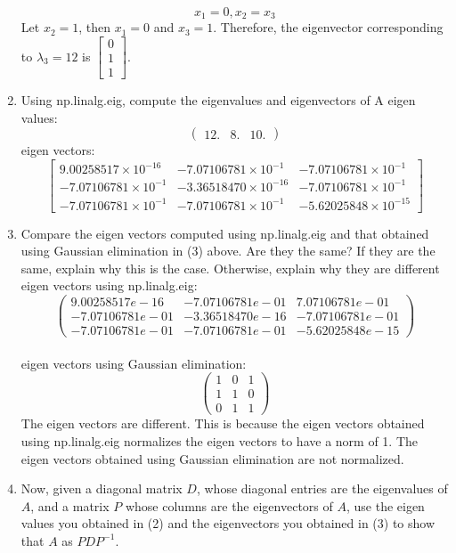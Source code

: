 \documentclass[12pt]{extarticle} %
\begin{document}
\begin{enumerate}
\[    \]
    \[
    x_1 = 0, x_2 = x_3
    \]
    Let $x_2 = 1$, then $x_1 = 0$ and $x_3 = 1$. Therefore, the eigenvector corresponding to $\lambda_3 = 12$ is $\begin{bmatrix} 0 \\ 1 \\ 1 \end{bmatrix}$.
    \item Using np.linalg.eig, compute the eigenvalues and eigenvectors of A
    eigen values:
    \[
    \begin{pmatrix}
        12. & 8. & 10.
    \end{pmatrix}
    \]
    eigen vectors:
    \[
        \begin{bmatrix}
            9.00258517 \times 10^{-16} & -7.07106781 \times 10^{-1} & -7.07106781 \times 10^{-1} \\
            -7.07106781 \times 10^{-1} & -3.36518470 \times 10^{-16} & -7.07106781 \times 10^{-1} \\
            -7.07106781 \times 10^{-1} & -7.07106781 \times 10^{-1} & -5.62025848 \times 10^{-15}
          \end{bmatrix}
    \]
    \item Compare the eigen vectors computed using np.linalg.eig and that obtained using Gaussian elimination in (3) above. Are they the same? If they are the same, explain why this is the case. Otherwise, explain why they are different
    \\ eigen vectors using np.linalg.eig:
    \[
        \begin{pmatrix}
            9.00258517e-16 & -7.07106781e-01 & 7.07106781e-01 \\
            -7.07106781e-01 & -3.36518470e-16 & -7.07106781e-01 \\
             -7.07106781e-01 & -7.07106781e-01 & -5.62025848e-15
        \end{pmatrix}
    \]
    \\ eigen vectors using Gaussian elimination:
    \[
        \begin{pmatrix}
            1 & 0 & 1 \\
            1 & 1 & 0 \\
            0 & 1 & 1
        \end{pmatrix}
    \]
    The eigen vectors are different. This is because the eigen vectors obtained using np.linalg.eig normalizes the eigen vectors to have a norm of 1. The eigen vectors obtained using Gaussian elimination are not normalized.
    \item Now, given a diagonal matrix \(D\), whose diagonal entries are the eigenvalues of \(A\), and a matrix \(P\) whose columns are the eigenvectors of \(A\), use the eigen values you obtained in (2) and the eigenvectors you obtained in (3) to show that \(A\) as \(PDP^{-1}\).

\end{enumerate}
\end{document}
